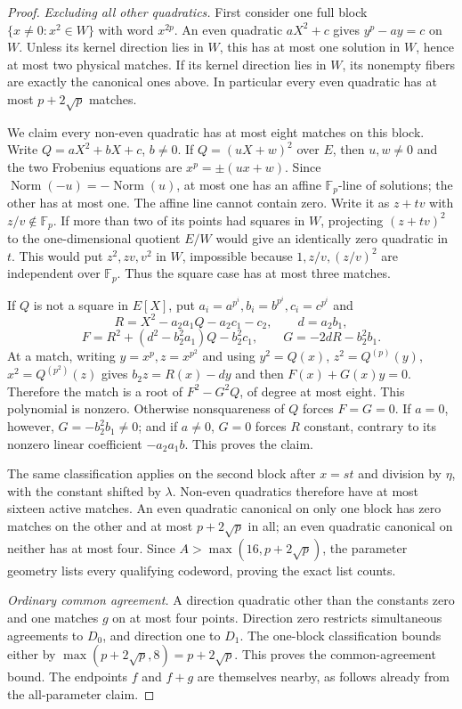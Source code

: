 \begin{proof}
\emph{Excluding all other quadratics.}
First consider one full block $\{x\ne0:x^2\in W\}$ with word $x^{2p}$.
An even quadratic $aX^2+c$ gives $y^p-ay=c$ on $W$. Unless its
kernel direction lies in $W$, this has at most one solution in $W$,
hence at most two physical matches. If its kernel direction lies in
$W$, its nonempty fibers are exactly the canonical ones above.
In particular every even quadratic has at most $p+2\sqrt p$ matches.

We claim every non-even quadratic has at most eight matches on this
block. Write $Q=aX^2+bX+c$, $b\ne0$. If $Q=(uX+w)^2$ over $E$,
then $u,w\ne0$ and the two Frobenius equations are
$x^p=\pm(ux+w)$. Since
$\operatorname{Norm}(-u)=-\operatorname{Norm}(u)$, at most one has
an affine $\mathbb F_p$-line of solutions; the other has at most one.
The affine line cannot contain zero. Write it as $z+t v$ with
$z/v\notin\mathbb F_p$. If more than two of its points had squares
in $W$, projecting $(z+tv)^2$ to the one-dimensional quotient $E/W$
would give an identically zero quadratic in $t$. This would put
$z^2,zv,v^2$ in $W$, impossible because
$1,z/v,(z/v)^2$ are independent over $\mathbb F_p$.
Thus the square case has at most three matches.

If $Q$ is not a square in $E[X]$, put
$a_i=a^{p^i},b_i=b^{p^i},c_i=c^{p^i}$ and
\[
 R=X^2-a_2a_1Q-a_2c_1-c_2,\qquad d=a_2b_1,
\]
\[
 F=R^2+(d^2-b_2^2a_1)Q-b_2^2c_1,\qquad
 G=-2dR-b_2^2b_1.
\]
At a match, writing $y=x^p,z=x^{p^2}$ and using
$y^2=Q(x)$, $z^2=Q^{(p)}(y)$, $x^2=Q^{(p^2)}(z)$ gives
$b_2z=R(x)-dy$ and then $F(x)+G(x)y=0$.
Therefore the match is a root of $F^2-G^2Q$, of degree at most eight.
This polynomial is nonzero. Otherwise nonsquareness of $Q$ forces
$F=G=0$. If $a=0$, however, $G=-b_2^2b_1\ne0$; and if $a\ne0$,
$G=0$ forces $R$ constant, contrary to its nonzero linear coefficient
$-a_2a_1b$. This proves the claim.

The same classification applies on the second block after $x=st$
and division by $\eta$, with the constant shifted by $\lambda$.
Non-even quadratics therefore have at most sixteen active matches.
An even quadratic canonical on only one block has zero matches on
the other and at most $p+2\sqrt p$ in all; an even quadratic canonical
on neither has at most four. Since $A>\max(16,p+2\sqrt p)$, the
parameter geometry lists every qualifying codeword, proving the exact
list counts.

\emph{Ordinary common agreement.}
A direction quadratic other than the constants zero and one matches
$g$ on at most four points. Direction zero restricts simultaneous
agreements to $D_0$, and direction one to $D_1$. The one-block
classification bounds either by $\max(p+2\sqrt p,8)=p+2\sqrt p$.
This proves the common-agreement bound. The endpoints $f$ and $f+g$
are themselves nearby, as follows already from the all-parameter claim.


\end{proof}
